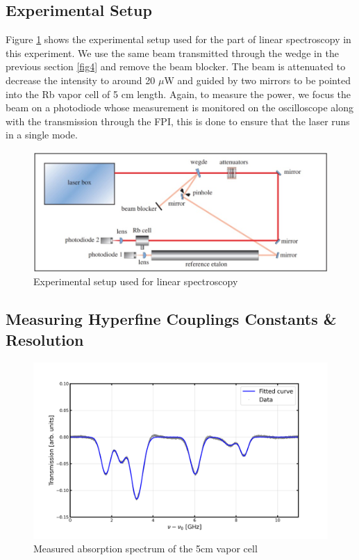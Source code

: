 \documentclass[12pt]{article}
\begin{document}
\subsection{Experimental Setup}
Figure \ref{fig8} shows the experimental setup used for the part of linear spectroscopy in this experiment.  We use the same beam transmitted through the wedge in the previous section \ref{fig4} and remove the beam blocker. The beam is attenuated to decrease the intensity to around 20 $\mu$W and guided by two mirrors to be pointed into the Rb vapor cell of 5 cm length.  Again, to measure the power, we focus the beam on a photodiode whose
measurement is monitored on the oscilloscope along with the transmission through the FPI, this is done to ensure that the laser runs in a single mode. 
\begin{figure}[H]
    \centering
    \includegraphics[width = \textwidth]{fig/setup3.jpg}
    \caption{Experimental setup used for linear spectroscopy \cite{lecturenote}}
    \label{fig8}
\end{figure}

\subsection{Measuring Hyperfine Couplings Constants \& Resolution}
\begin{figure}[H]
    \centering
    \includegraphics[width = \textwidth]{fig/Experimental_spectrum_backgrundremove.png}
    \caption{Measured absorption spectrum of the 5cm vapor cell}
    \label{fig9}
\end{figure}
\end{document}
